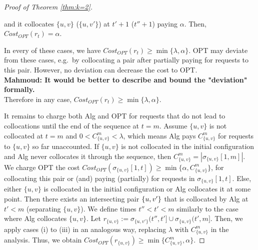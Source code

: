 \documentclass[manuscript,screen=true, review, anonymous]{acmart}
\DeclarePairedDelimiter\set{\{}{\}}
\newcommand\mahmoud[1]{\color{orange}\textbf{\\ Mahmoud: #1}\\\color{black}}
\begin{document}
\begin{proof}[Proof of Theorem \ref{thm:k=2}]
\begin{enumerate}[label=\roman*.]
		 and it collocates $\{u,v\}$ ($\{u,v'\}$) at $t'+1$ ($t''+1$) paying $\alpha$.
Then,
$\mathit{Cost}_{\mathit{OPT}} (r_t) = \alpha$.
	\end{enumerate}
	 In every of these cases,
   	we have
   	$\mathit{Cost}_{\mathit{OPT}} (r_t) \geq  \min{ \{ \lambda, \alpha \}}$.
  	OPT may deviate from these cases,
	e.g.~by collocating a pair after partially paying for requests to this pair.
	 However,
	 no deviation can decrease the cost to OPT.
	 \mahmoud{It would be better to describe and bound the "deviation" formally.}
	Therefore in any case,
 	$\mathit{Cost}_{\mathit{OPT}} (r_t) \geq  \min{ \{ \lambda, \alpha \}}$.
	
	It remains to charge both Alg and OPT for requests that do not lead to collocations until the  end of the sequence at $t=m$.
	Assume $\{u,v\}$ is not collocated at $t=m$
	and $0 < C^{m}_{ \{u,v\} } < \lambda $,
	which means Alg pays $C^{m}_{ \{u,v\} }$
	for requests to $\{u,v\}$ so far unaccounted.
	If $\{u,v\}$ is not collocated in the initial configuration
	and Alg never collocates it through the sequence,
	then $ C^{m}_{ \{u,v\} } =| \sigma_{\{u,v\}}[1,m] |$.
	We charge OPT the cost
	$\mathit{Cost}_{\mathit{OPT}} (\sigma_{\{u,v\}}[1,t]) 
	\geq \min{ \{ \alpha, C^{m}_{ \{u,v\} } \} }$,
	for collocating this pair or (and) paying (partially) for requests in $\sigma_{\{u,v\}}[1,t]$.
	Else,
	either $\{u,v\}$ is collocated in the initial configuration
	or Alg collocates it at some point.
	Then there exists an intersecting pair $\set{u,v'}$
	that is collocated by Alg at $t' < m$ (separating $\{u,v\}$).
	We define times $t'' < t' < m$ similarly to the case where Alg collocates $\{u,v\}$.
	Let $r_{\{u,v\}} := \sigma_{\{u,v'\}} (t'',t'] \cup \sigma_{\{u,v\}} (t',m]$.
	Then,
	we apply cases (i) to (iii) in an analogous way,
	 replacing $\lambda$ with $C^{m}_{ \{u,v\}}$ in the analysis.
	Thus, 
	we obtain
	 $\mathit{Cost}_{\mathit{OPT}} (r_{\{u,v\}}) 
	 \geq  \min{ \{ C^{m}_{ \{u,v\}}, \alpha \}}$.
	 

\end{proof}
\end{document}
